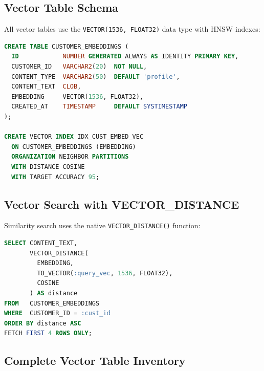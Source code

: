 \documentclass[12pt,a4paper]{article}
\begin{document}
\subsection{Vector Table Schema}

All vector tables use the \texttt{VECTOR(1536, FLOAT32)} data type with HNSW indexes:

\begin{lstlisting}[language=SQL, caption={Vector table schema example}]
CREATE TABLE CUSTOMER_EMBEDDINGS (
  ID            NUMBER GENERATED ALWAYS AS IDENTITY PRIMARY KEY,
  CUSTOMER_ID   VARCHAR2(20)  NOT NULL,
  CONTENT_TYPE  VARCHAR2(50)  DEFAULT 'profile',
  CONTENT_TEXT  CLOB,
  EMBEDDING     VECTOR(1536, FLOAT32),
  CREATED_AT    TIMESTAMP     DEFAULT SYSTIMESTAMP
);

CREATE VECTOR INDEX IDX_CUST_EMBED_VEC
  ON CUSTOMER_EMBEDDINGS (EMBEDDING)
  ORGANIZATION NEIGHBOR PARTITIONS
  WITH DISTANCE COSINE
  WITH TARGET ACCURACY 95;
\end{lstlisting}

\subsection{Vector Search with VECTOR\_DISTANCE}

Similarity search uses the native \texttt{VECTOR\_DISTANCE()} function:

\begin{lstlisting}[language=SQL, caption={Cosine similarity vector search}]
SELECT CONTENT_TEXT,
       VECTOR_DISTANCE(
         EMBEDDING,
         TO_VECTOR(:query_vec, 1536, FLOAT32),
         COSINE
       ) AS distance
FROM   CUSTOMER_EMBEDDINGS
WHERE  CUSTOMER_ID = :cust_id
ORDER BY distance ASC
FETCH FIRST 4 ROWS ONLY;
\end{lstlisting}

\subsection{Complete Vector Table Inventory}
\end{document}
